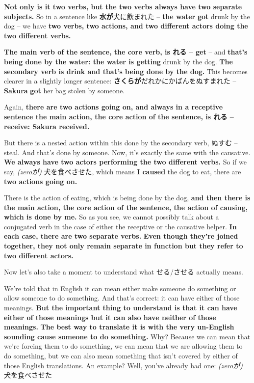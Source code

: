 {}

{\bf Not only is it two verbs, but the two verbs always have two separate subjects.} So in a sentence like {\bf 水が}犬に飲まれた -- {\bf the water} {\bf got} drunk by the dog -- we have {\bf two verbs, two actions, and two different actors doing the two different verbs.}

{}

{\bf The main verb of the sentence, the core verb, is れる -- get} -- and {\bf that's being done by the water: the water is getting} drunk by the dog. {\bf The secondary verb is drink and that's being done by the dog.} This becomes clearer in a slightly longer sentence: {\bf さくらが}だれかにかばんをぬすまれた -- {\bf Sakura} {\bf got} her bag stolen by someone.

{}

Again, {\bf there are two actions going on, and always in a receptive sentence the main action, the core action of the sentence, is れる -- receive: Sakura received.}

\thinrule

But there is a nested action within this done by the secondary verb, ぬすむ -- steal. And that's done by someone. Now, it's exactly the same with the causative. {\bf We always have two actors performing the two different verbs.} So if we say, {\em (zeroが)} 犬を食べさせた, which means {\bf I caused} the dog to eat, there are {\bf two actions going on.}

{}

There is the action of eating, which is being done by the dog, {\bf and then there is the main action, the core action of the sentence, the action of causing, which is done by me.} So as you see, we cannot possibly talk about a conjugated verb in the case of either the receptive or the causative helper. {\bf In each case, there are two separate verbs.} {\bf Even though they're joined together, they not only remain separate in function but they refer to two different actors.}

Now let's also take a moment to understand what せる/させる actually means.

{}

We're told that in English it can mean either make someone do something or allow someone to do something. And that's correct: it can have either of those meanings. {\bf But the important thing to understand is that it can have either of those meanings but it can also have neither of those meanings.} {\bf The best way to translate it is with the very un-English sounding cause someone to do something.} Why? Because we can mean that we're forcing them to do something, we can mean that we are allowing them to do something, but we can also mean something that isn't covered by either of those English translations. An example? Well, you've already had one: {\em (zeroが)} 犬を食べさせた

